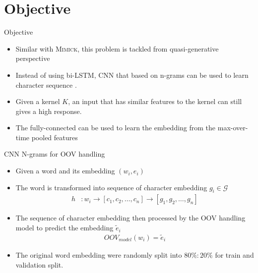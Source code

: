\documentclass{beamer}
\begin{document}
\section{Objective}
\begin{frame}{Objective}
    \begin{itemize}
        \item Similar with \textsc{Mimick}, this problem is tackled
        from quasi-generative perspective
        \item Instead of using bi-LSTM, CNN that based on n-grams can
        be used to learn character sequence \cite{convolutional2014kim}.
        \item Given a kernel $K$, an input that has similar features
        to the kernel can still gives a high response.
        \item The fully-connected can be used to learn the embedding
        from the max-over-time pooled features
    \end{itemize}
\end{frame}

\begin{frame}{CNN N-grams for OOV handling}
    \begin{itemize}
        \item Given a word and its embedding $(w_i, e_i)$
        \item The word is transformed into sequence of character
        embedding $g_i \in \mathcal{G}$
        \begin{align*}
            h &: w_i \rightarrow [c_1, c_2,\dots, c_n] \rightarrow [g_1, g_2,\dots,g_n]
        \end{align*}
        \item The sequence of character embedding then processed by
        the OOV handling model to predict the embedding $\tilde{e}_i$
        \begin{align*}
            OOV_{model}(w_i) = \tilde{e}_i
        \end{align*}
        \item The original word embedding were randomly split into $80\%:20\%$
        for train and validation split.
    \end{itemize}
\end{frame}
\end{document}
